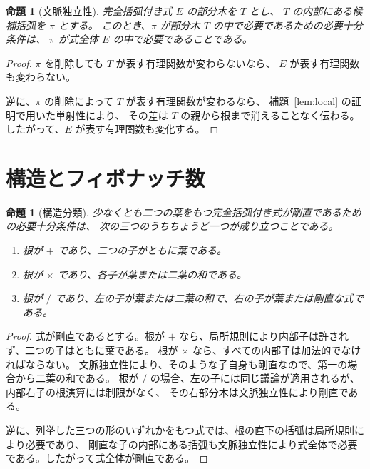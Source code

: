 \documentclass[11pt]{ltjsarticle}
\newtheorem{proposition}[theorem]{命題}
\begin{document}
\begin{proposition}[文脈独立性]\label{cor:context}
完全括弧付き式 $E$ の部分木を $T$ とし、
$T$ の内部にある候補括弧を $\pi$ とする。
このとき、$\pi$ が部分木 $T$ の中で必要であるための必要十分条件は、
$\pi$ が式全体 $E$ の中で必要であることである。
\end{proposition}

\begin{proof}
$\pi$ を削除しても $T$ が表す有理関数が変わらないなら、
$E$ が表す有理関数も変わらない。

逆に、$\pi$ の削除によって $T$ が表す有理関数が変わるなら、
補題~\ref{lem:local} の証明で用いた単射性により、
その差は $T$ の親から根まで消えることなく伝わる。
したがって、$E$ が表す有理関数も変化する。
\end{proof}




\section{構造とフィボナッチ数}

\begin{proposition}[構造分類]\label{prop:structure}
少なくとも二つの葉をもつ完全括弧付き式が剛直であるための必要十分条件は、
次の三つのうちちょうど一つが成り立つことである。
\begin{enumerate}
\item 根が $+$ であり、二つの子がともに葉である。
\item 根が $\times$ であり、各子が葉または二葉の和である。
\item 根が $/$ であり、左の子が葉または二葉の和で、右の子が葉または剛直な式である。
\end{enumerate}
\end{proposition}

\begin{proof}
式が剛直であるとする。根が $+$ なら、局所規則により内部子は許されず、二つの子はともに葉である。
根が $\times$ なら、すべての内部子は加法的でなければならない。
文脈独立性により、そのような子自身も剛直なので、第一の場合から二葉の和である。
根が $/$ の場合、左の子には同じ議論が適用されるが、内部右子の根演算には制限がなく、
その右部分木は文脈独立性により剛直である。

逆に、列挙した三つの形のいずれかをもつ式では、根の直下の括弧は局所規則により必要であり、
剛直な子の内部にある括弧も文脈独立性により式全体で必要である。したがって式全体が剛直である。
\end{proof}
\end{document}
